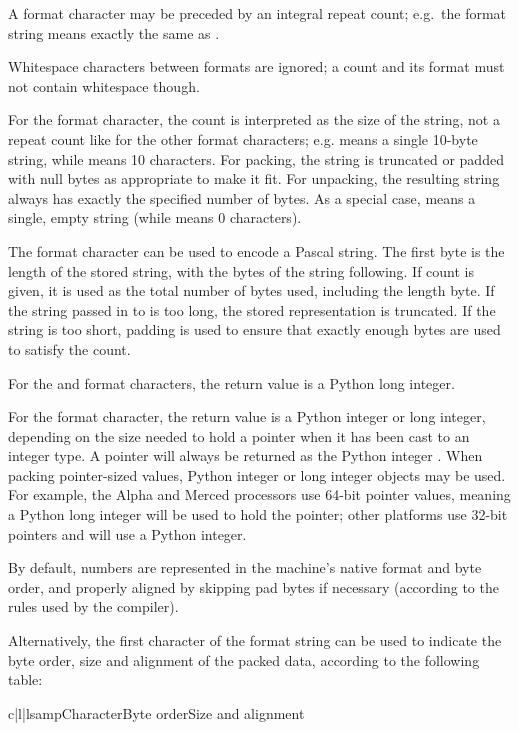 A format character may be preceded by an integral repeat count;
e.g.\ the format string  means exactly the same as
.

Whitespace characters between formats are ignored; a count and its
format must not contain whitespace though.

For the  format character, the count is interpreted as the
size of the string, not a repeat count like for the other format
characters; e.g.  means a single 10-byte string, while
 means 10 characters.  For packing, the string is
truncated or padded with null bytes as appropriate to make it fit.
For unpacking, the resulting string always has exactly the specified
number of bytes.  As a special case,  means a single, empty
string (while  means 0 characters).

The  format character can be used to encode a Pascal
string.  The first byte is the length of the stored string, with the
bytes of the string following.  If count is given, it is used as the
total number of bytes used, including the length byte.  If the string
passed in to  is too long, the stored representation
is truncated.  If the string is too short, padding is used to ensure
that exactly enough bytes are used to satisfy the count.

For the  and  format characters, the return
value is a Python long integer.

For the  format character, the return value is a Python
integer or long integer, depending on the size needed to hold a
pointer when it has been cast to an integer type.  A \NULL{} pointer will
always be returned as the Python integer . When packing pointer-sized
values, Python integer or long integer objects may be used.  For
example, the Alpha and Merced processors use 64-bit pointer values,
meaning a Python long integer will be used to hold the pointer; other
platforms use 32-bit pointers and will use a Python integer.

By default, \C{} numbers are represented in the machine's native format
and byte order, and properly aligned by skipping pad bytes if
necessary (according to the rules used by the \C{} compiler).

Alternatively, the first character of the format string can be used to
indicate the byte order, size and alignment of the packed data,
according to the following table:

\begin{tableiii}{c|l|l}{samp}{Character}{Byte order}{Size and alignment}
\end{tableiii}

